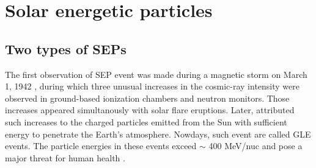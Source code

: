 

\label{chp:background}

\section{Solar energetic particles}

\subsection*{Two types of SEPs}


The first observation of \ac{SEP} event was made during a magnetic storm on March 1, 1942 \citep{lange1942note,forbush1942further}, during which three unusual increases in the cosmic-ray intensity were observed in ground-based ionization chambers and neutron monitors. Those increases appeared simultanously with solar flare eruptions. Later, \citet{Forbush1946} attributed such increases to the charged particles emitted from the Sun with sufficient energy to penetrate the Earth's atmosphere. Nowdays, such event are called \ac{GLE} events. The particle energies in these events exceed $\sim$ 400 MeV/nuc and pose a major threat for human health \citep{meyer1956solar,Shea2012SSRv,gopalswamy2013first,thakur2014ground, Reames2013, Mironshnichenko2013Ge}.

